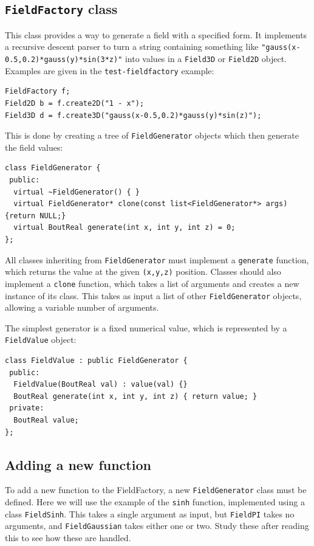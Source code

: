 \documentclass[12pt]{article}
\begin{document}
\subsection{\lstinline!FieldFactory! class}

This class provides a way to generate a field with a specified form. It implements
a recursive descent parser to turn a string containing something like
\lstinline!"gauss(x-0.5,0.2)*gauss(y)*sin(3*z)"! into values in a \lstinline!Field3D!
or \lstinline!Field2D! object. Examples are given in the \texttt{test-fieldfactory} example:
\begin{lstlisting}
FieldFactory f;
Field2D b = f.create2D("1 - x");
Field3D d = f.create3D("gauss(x-0.5,0.2)*gauss(y)*sin(z)");
\end{lstlisting}

This is done by creating a tree of \lstinline!FieldGenerator! objects
which then generate the field values: 
\begin{lstlisting}[firstnumber=49]
class FieldGenerator {
 public:
  virtual ~FieldGenerator() { }
  virtual FieldGenerator* clone(const list<FieldGenerator*> args) {return NULL;}
  virtual BoutReal generate(int x, int y, int z) = 0;
};
\end{lstlisting}
All classes inheriting from \lstinline!FieldGenerator! must implement a
\lstinline!generate! function, which returns the value
at the given \lstinline!(x,y,z)! position. Classes should also implement a
\lstinline!clone! function, which takes a list of arguments and creates a new
instance of its class. This takes as input a list of other \lstinline!FieldGenerator! objects,
allowing a variable number of arguments. 

The simplest generator is a fixed numerical value, which is represented
by a \lstinline!FieldValue! object: 
\begin{lstlisting}[firstnumber=59]
class FieldValue : public FieldGenerator {
 public:
  FieldValue(BoutReal val) : value(val) {}
  BoutReal generate(int x, int y, int z) { return value; }
 private:
  BoutReal value;
};
\end{lstlisting}

\subsection{Adding a new function}

To add a new function to the FieldFactory, a new \lstinline!FieldGenerator! class
must be defined. Here we will use the example of the \lstinline!sinh! function, implemented
using a class \lstinline!FieldSinh!. This takes a single argument as input, but
\lstinline!FieldPI! takes no arguments, and \lstinline!FieldGaussian! takes either one or two.
Study these after reading this to see how these are handled.
\end{document}
